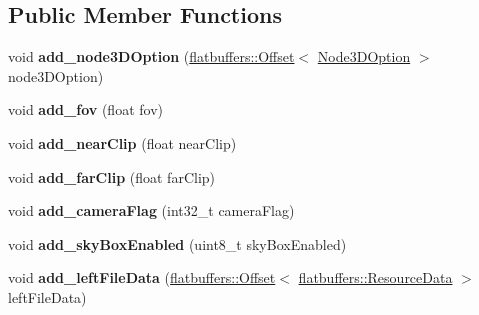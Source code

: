 \subsection*{Public Member Functions}
\begin{DoxyCompactItemize}
\item 
\mbox{\label{structflatbuffers_1_1UserCameraOptionsBuilder_a8270c8212f542be80d44b94b3aab02d8}} 
void {\bfseries add\+\_\+node3\+D\+Option} (\hyperlink{structflatbuffers_1_1Offset}{flatbuffers\+::\+Offset}$<$ \hyperlink{structflatbuffers_1_1Node3DOption}{Node3\+D\+Option} $>$ node3\+D\+Option)
\item 
\mbox{\label{structflatbuffers_1_1UserCameraOptionsBuilder_acf7edbe2c34aad60b5c3a6222a27cde8}} 
void {\bfseries add\+\_\+fov} (float fov)
\item 
\mbox{\label{structflatbuffers_1_1UserCameraOptionsBuilder_a0f044ea1d36544e66bd1d6c037e9b5ae}} 
void {\bfseries add\+\_\+near\+Clip} (float near\+Clip)
\item 
\mbox{\label{structflatbuffers_1_1UserCameraOptionsBuilder_a6d2f9634e2c559d0fdf1868872ea83b2}} 
void {\bfseries add\+\_\+far\+Clip} (float far\+Clip)
\item 
\mbox{\label{structflatbuffers_1_1UserCameraOptionsBuilder_a1b833165a8a036fdfd9de3aa967b5785}} 
void {\bfseries add\+\_\+camera\+Flag} (int32\+\_\+t camera\+Flag)
\item 
\mbox{\label{structflatbuffers_1_1UserCameraOptionsBuilder_ac35c9b5620b83f884d4d4084217eaa39}} 
void {\bfseries add\+\_\+sky\+Box\+Enabled} (uint8\+\_\+t sky\+Box\+Enabled)
\item 
\mbox{\label{structflatbuffers_1_1UserCameraOptionsBuilder_a90fd56f2df0ac711ac0dea86279f5bfc}} 
void {\bfseries add\+\_\+left\+File\+Data} (\hyperlink{structflatbuffers_1_1Offset}{flatbuffers\+::\+Offset}$<$ \hyperlink{structflatbuffers_1_1ResourceData}{flatbuffers\+::\+Resource\+Data} $>$ left\+File\+Data)

\end{DoxyCompactItemize}
